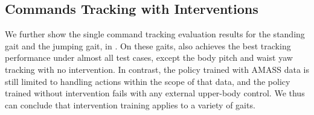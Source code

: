 


\subsection{Commands Tracking with Interventions}
\label{ap:SingleCommandsTracking-REMAIN}
We further show the single command tracking evaluation results for the standing gait and the jumping gait, in .
On these gaits, \our also achieves the best tracking performance under almost all test cases, except the body pitch and waist yaw tracking with no intervention. In contrast, the policy trained with AMASS data is still limited to handling actions within the scope of that data, and the policy trained without intervention fails with any external upper-body control. We thus can conclude that intervention training applies to a variety of gaits. 

